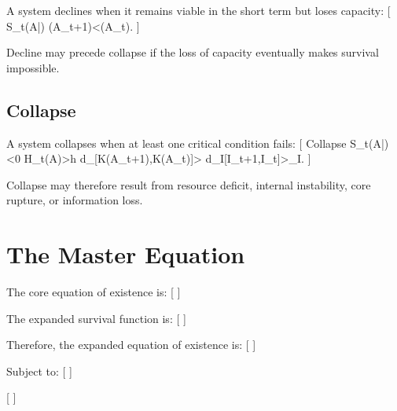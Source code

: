 \documentclass[11pt,a4paper]{article}
\newcommand{\Cap}{\operatorname{Cap}}
\begin{document}
A system declines when it remains viable in the short term but loses capacity:
[
S_t(A|\Omega)
\wedge
\Cap(A_{t+1})<\Cap(A_t).
]

Decline may precede collapse if the loss of capacity eventually makes survival impossible.

\subsection{Collapse}

A system collapses when at least one critical condition fails:
[
Collapse
\Longleftrightarrow
S_t(A|\Omega)<0
\vee
H_t(A)>h
\vee
d_{\Omega}[K(A_{t+1}),K(A_t)]>\theta
\vee
d_I[I_{t+1},I_t]>\theta_I.
]

Collapse may therefore result from resource deficit, internal instability, core rupture, or information loss.

\section{The Master Equation}

The core equation of existence is:
[
]

The expanded survival function is:
[
]

Therefore, the expanded equation of existence is:
[
]

Subject to:
[
]

[
]
\end{document}
